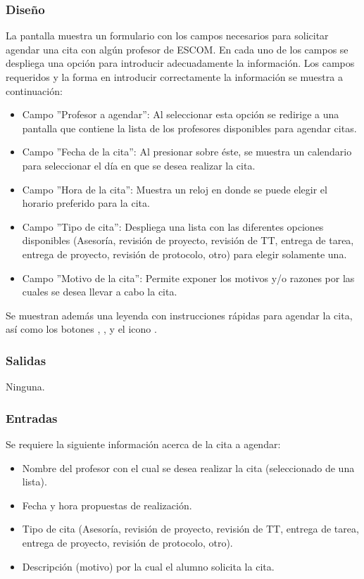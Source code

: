 \subsubsection{Diseño}
	\noindent
	La pantalla muestra un formulario con los campos necesarios para solicitar agendar una cita con algún profesor de ESCOM. En cada uno de los campos se despliega una opción para introducir adecuadamente la información. Los campos requeridos y la forma en introducir correctamente la información se muestra a continuación: 
	\begin{itemize}
		\item Campo ''Profesor a agendar'': Al seleccionar esta opción se redirige a una pantalla que contiene la lista de los profesores disponibles para agendar citas.
		\item Campo ''Fecha de la cita'': Al presionar sobre éste, se muestra un calendario para seleccionar el día en que se desea realizar la cita.
		\item Campo ''Hora de la cita'': Muestra un reloj en donde se puede elegir el horario preferido para la cita.	
		\item Campo ''Tipo de cita'': Despliega una lista con las diferentes opciones disponibles (Asesoría, revisión de proyecto, revisión de TT, entrega de tarea, entrega de proyecto, revisión de protocolo, otro) para elegir solamente una. 
		\item Campo ''Motivo de la cita'': Permite exponer los motivos y/o razones por las cuales se desea llevar a cabo la cita.
	\end{itemize}
	Se muestran además una leyenda con instrucciones rápidas para agendar la cita, así como los botones , , y el icono .

\pagebreak
{}

\subsubsection{Salidas}
	\noindent
	Ninguna.

\subsubsection{Entradas}
	Se requiere la siguiente información acerca de la cita a agendar:
	\begin{itemize}
		\item Nombre del profesor con el cual se desea realizar la cita (seleccionado de una lista).
		\item Fecha y hora propuestas de realización.
		\item Tipo de cita (Asesoría, revisión de proyecto, revisión de TT, entrega de tarea, entrega de proyecto, revisión de protocolo, otro).
		\item Descripción (motivo) por la cual el alumno solicita la cita.
	\end{itemize}

